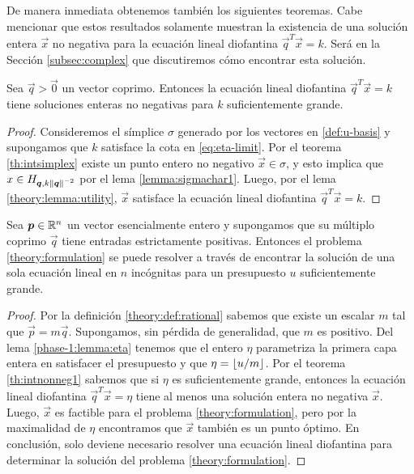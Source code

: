 De manera inmediata obtenemos también los siguientes teoremas. Cabe mencionar que estos resultados
solamente muestran la existencia de una solución entera $\vec{x}$ no negativa para la ecuación lineal
diofantina $\vec{q}^T\vec{x} = k$. Será en la Sección \ref{subsec:complex} que discutiremos cómo
encontrar esta solución.
\begin{theorem}
	\label{th:intnonneg1}
	Sea $\vec{q} > \vec{0}$ un vector coprimo. Entonces la ecuación lineal diofantina
	$\vec{q}^T\vec{x} = k$ tiene soluciones enteras no negativas para $k$ suficientemente grande.
\end{theorem}
\begin{proof}
	Consideremos el símplice $\sigma$ generado por los vectores en \eqref{def:u-basis} y supongamos
	que $k$ satisface la cota en \eqref{eq:eta-limit}.
	Por el teorema \ref{th:intsimplex} existe un punto entero no negativo $\vec{x} \in \sigma$, y
	esto implica que $x \in H_{\boldsymbol{q}, k\left\lVert \boldsymbol{q} \right\rVert^{-2}}$ por el lema \ref{lemma:sigmachar1}.
	Luego, por el lema \ref{theory:lemma:utility}, $\vec{x}$ satisface la ecuación lineal diofantina
	$\vec{q}^T\vec{x} = k$.
\end{proof}
\begin{theorem}
	\label{th:intnonneg2}
	Sea $\boldsymbol{p} \in \mathbb{R}^n$ un vector esencialmente entero y supongamos que su múltiplo coprimo
	$\vec{q}$ tiene entradas estrictamente positivas. Entonces el problema
	\eqref{theory:formulation} se puede resolver a través de encontrar la solución de una sola
	ecuación lineal en $n$ incógnitas para un presupuesto $u$ suficientemente grande.
\end{theorem}
\begin{proof}
	Por la definición \ref{theory:def:rational} sabemos que existe un escalar $m$ tal que
	$\vec{p} = m\vec{q}$. Supongamos, sin pérdida de generalidad, que $m$ es positivo. Del lema
	\ref{phase-1:lemma:eta} tenemos que el entero $\eta$ parametriza la primera capa entera en
	satisfacer el presupuesto y que $\eta = \left\lfloor u/m \right\rfloor$. Por el teorema \ref{th:intnonneg1} sabemos
	que si $\eta$ es suficientemente grande, entonces la ecuación lineal diofantina
	$\vec{q}^T\vec{x} = \eta$ tiene al menos una solución entera no negativa $\vec{x}$. Luego,
	$\vec{x}$ es factible para el problema \eqref{theory:formulation}, pero por la maximalidad de
	$\eta$ encontramos que $\vec{x}$ también es un punto óptimo. En conclusión, solo deviene
	necesario resolver una ecuación lineal diofantina para determinar la solución del problema
	\eqref{theory:formulation}.
\end{proof}

